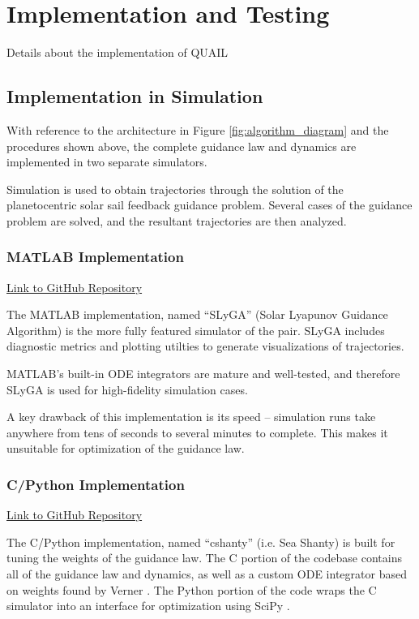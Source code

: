 \chapter{Implementation and Testing}

Details about the implementation of QUAIL


\section{Implementation in Simulation}
With reference to the architecture in Figure \ref{fig:algorithm_diagram} and the procedures shown above, the complete guidance law and dynamics are implemented in two separate simulators.

Simulation is used to obtain trajectories through the solution of the planetocentric solar sail feedback guidance problem. Several cases of the guidance problem are solved, and the resultant trajectories are then analyzed.

\subsection{MATLAB Implementation}
\href{https://github.com/itchono/SLyGA}{Link to GitHub Repository}

The MATLAB implementation, named ``SLyGA'' (Solar Lyapunov Guidance Algorithm) is the more fully featured simulator of the pair. SLyGA includes diagnostic metrics and plotting utilties to generate visualizations of trajectories.

MATLAB's built-in ODE integrators are mature and well-tested, and therefore SLyGA is used for high-fidelity simulation cases.

A key drawback of this implementation is its speed -- simulation runs take anywhere from tens of seconds to several minutes to complete. This makes it unsuitable for optimization of the guidance law.

\subsection{C/Python Implementation}
\href{https://github.com/itchono/cshanty}{Link to GitHub Repository}

The C/Python implementation, named ``cshanty'' (i.e. Sea Shanty) is built for tuning the weights of the guidance law. The C portion of the codebase contains all of the guidance law and dynamics, as well as a custom ODE integrator based on weights found by Verner \cite{verner2010numerically}. The Python portion of the code wraps the C simulator into an interface for optimization using SciPy \cite{2020SciPy-NMeth}.

